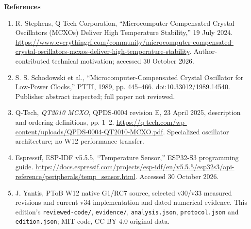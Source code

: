 \documentclass[11pt,letterpaper]{article}
\newcommand{\code}[1]{\texttt{\small #1}}
\begin{document}
\vspace{2pt}\textbf{References}\vspace{-3pt}
\begin{enumerate}\small\setlength{\itemsep}{2pt}\setlength{\parskip}{0pt}\setlength{\parsep}{0pt}
\item R. Stephens, Q-Tech Corporation, ``Microcomputer Compensated Crystal Oscillators (MCXOs) Deliver High Temperature Stability,'' 19 July 2024. \url{https://www.everythingrf.com/community/microcomputer-compensated-crystal-oscillators-mcxos-deliver-high-temperature-stability}. Author-contributed technical motivation; accessed 30 October 2026.
\item S. S. Schodowski et al., ``Microcomputer-Compensated Crystal Oscillator for Low-Power Clocks,'' PTTI, 1989, pp. 445--466. \href{https://doi.org/10.33012/1989.14540}{doi:10.33012/1989.14540}. Publisher abstract inspected; full paper not reviewed.
\item Q-Tech, \textit{QT2010 MCXO}, QPDS-0004 revision E, 23 April 2025, description and ordering definitions, pp. 1--2. \url{https://q-tech.com/wp-content/uploads/QPDS-0004-QT2010-MCXO.pdf}. Specialized oscillator architecture; no W12 performance transfer.
\item Espressif, ESP-IDF v5.5.5, ``Temperature Sensor,'' ESP32-S3 programming guide. \url{https://docs.espressif.com/projects/esp-idf/en/v5.5.5/esp32s3/api-reference/peripherals/temp_sensor.html}. Accessed 30 October 2026.
\item J. Yantis, PToB W12 native G1/RC7 source, selected v30/v33 measured revisions and current v34 implementation and dated numerical evidence. This edition's \code{reviewed-code/}, \code{evidence/}, \code{analysis.json}, \code{protocol.json} and \code{edition.json}; MIT code, CC BY 4.0 original data.
\end{enumerate}
\newpage
\end{document}
